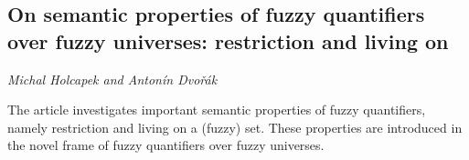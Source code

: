 \documentclass[../booklet.tex]{subfiles}
\begin{document}
\subsection[On semantic properties of fuzzy quantifiers over fuzzy universes:  restriction and living on. {\it Michal Holcapek and Antonín Dvořák}]{On semantic properties of fuzzy quantifiers over fuzzy universes:  restriction and living on}
 

\begin{center}
  {\it Michal Holcapek and Antonín Dvořák}
\end{center}



The article investigates important semantic properties of fuzzy quantifiers, namely restriction and living on a (fuzzy) set. These properties are introduced in the novel frame of fuzzy quantifiers over fuzzy universes.

\end{document}
